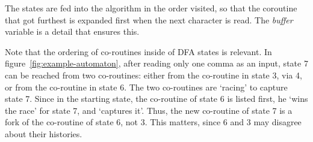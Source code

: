 \documentclass[11pt,a4paper,twoside,openright]{Thesis}
\theoremstyle{definition}
\newcommand{\Figref}[1]{figure~\ref{fig:#1}}
\begin{document}
The states are fed into the algorithm in the order visited, so that the
coroutine that got furthest is expanded first when the next character is
read. The \emph{buffer} variable is a detail that ensures this.

Note that the ordering of co-routines inside of DFA states is relevant.
In \Figref{example-automaton}, after reading only one comma as an
input, state 7 can be reached from two co-routines: either from the
co-routine in state 3, via 4, or from the co-routine in state 6. The two
co-routines are `racing' to capture state 7. Since in the starting
state, the co-routine of state 6 is listed first, he `wins the race'
for state 7, and `captures it'. Thus, the new co-routine of state 7 is
a fork of the co-routine of state 6, not 3. This matters, since 6 and
3 may disagree about their histories.
\end{document}
